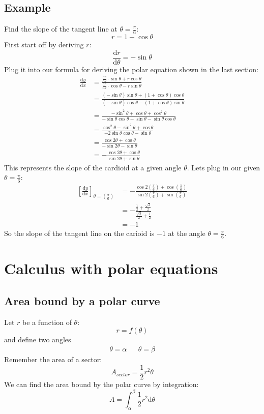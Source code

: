 \documentclass{report}
\begin{document}
    \subsection{Example}
        Find the slope of the tangent line at \(\theta = \frac{\pi}{6}\):
        \[r = 1 + \cos \theta\]
        First start off by deriving \(r\):
        \[\frac{\mathrm{d}r}{\mathrm{d}\theta} = - \sin \theta\]
        Plug it into our formula for deriving the polar equation shown in the last section:
        \begin{align*}
            \frac{\mathrm{d}y}{\mathrm{d}x} &= \frac{\frac{\mathrm{d}r}{\mathrm{d}\theta} \cdot \sin \theta + r \cos \theta}{\frac{\mathrm{d}r}{\mathrm{d}\theta} \cdot \cos \theta - r \sin \theta} \\
            &= \frac{(- \sin \theta) \sin \theta + (1 + \cos \theta) \cos \theta}{(- \sin \theta) \cos \theta - (1 + \cos \theta) \sin \theta} \\
            &= \frac{- \sin^2 \theta + \cos \theta + \cos^2 \theta}{- \sin \theta \cos \theta - \sin \theta - \sin \theta \cos \theta} \\
            &= \frac{\cos^2 \theta - \sin^2 \theta + \cos \theta}{-2 \sin \theta \cos \theta - \sin \theta} \\
            &= \frac{\cos 2 \theta + \cos \theta}{- \sin 2 \theta - \sin \theta} \\
            &= - \frac{\cos 2 \theta + \cos \theta}{\sin 2 \theta + \sin \theta}
        \end{align*} 
        This represents the slope of the cardioid at a given angle \(\theta\).
        Lets plug in our given \(\theta = \frac{\pi}{6}\):
        \begin{align*}
            \left[ \frac{\mathrm{d}y}{\mathrm{d}x} \right]_{\theta = (\frac{\pi}{6})} &= - \frac{\cos 2 (\frac{\pi}{6}) + \cos (\frac{\pi}{6})}{\sin 2 (\frac{\pi}{6}) + \sin (\frac{\pi}{6})} \\
            &= - \frac{\frac{1}{2} + \frac{\sqrt{3}}{2}}{\frac{\sqrt{3}}{2} + \frac{1}{2}} \\
            &= -1
        \end{align*}
        So the slope of the tangent line on the carioid is \(-1\) at the angle \(\theta = \frac{\pi}{6}\).

\section{Calculus with polar equations}
    \subsection{Area bound by a polar curve}
        Let \(r\) be a function of \(\theta\):
        \[r = f(\theta)\]
        and define two angles
        \begin{align*}
            \theta = \alpha &&
            \theta = \beta
        \end{align*}
        Remember the area of a sector:
        \[A_{sector} = \frac{1}{2}r^2 \theta\]
        We can find the area bound by the polar curve by integration:
        \[A = \int_\alpha^\beta \frac{1}{2} r^2 \mathrm{d}\theta\]
    
\end{document}
